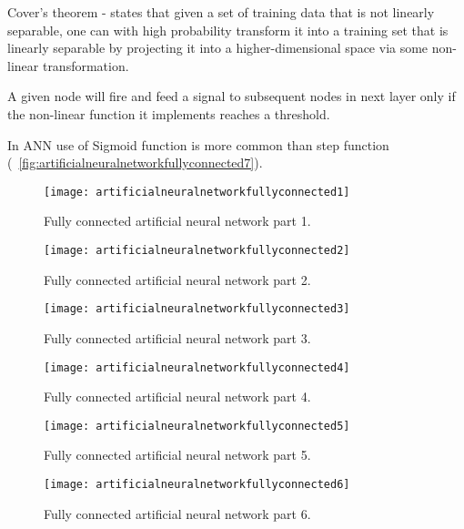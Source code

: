 \begin{numberedlist}
\begin{numberedlist}
			\item Cover's theorem - states that given a set of training data that is not linearly separable, one can with high probability transform it into a training set that is linearly separable by projecting it into a higher-dimensional space via some non-linear transformation.
		\end{numberedlist}
		\item A given node will fire and feed a signal to subsequent nodes in next layer only if the non-linear function it implements reaches a threshold.
		\item In ANN use of Sigmoid function is more common than step function (\figurename~\ref{fig:artificialneuralnetworkfullyconnected7}).
	\end{numberedlist}

 	\begin{figure}[h]
		\centering
		\texttt{[image: artificialneuralnetworkfullyconnected1]}
		\caption[Fully connected artificial neural network part 1]{Fully connected artificial neural network part 1.}
		\label{fig:artificialneuralnetworkfullyconnected1}
	\end{figure}
 	\begin{figure}[h]
		\centering
		\texttt{[image: artificialneuralnetworkfullyconnected2]}
		\caption[Fully connected artificial neural network part 2]{Fully connected artificial neural network part 2.}
		\label{fig:artificialneuralnetworkfullyconnected2}
	\end{figure}
 	\begin{figure}[h]
		\centering
		\texttt{[image: artificialneuralnetworkfullyconnected3]}
		\caption[Fully connected artificial neural network part 3]{Fully connected artificial neural network part 3.}
		\label{fig:artificialneuralnetworkfullyconnected3}
	\end{figure}
 	\begin{figure}[h]
		\centering
		\texttt{[image: artificialneuralnetworkfullyconnected4]}
		\caption[Fully connected artificial neural network part 4]{Fully connected artificial neural network part 4.}
		\label{fig:artificialneuralnetworkfullyconnected4}
	\end{figure}
 	\begin{figure}[h]
		\centering
		\texttt{[image: artificialneuralnetworkfullyconnected5]}
		\caption[Fully connected artificial neural network part 5]{Fully connected artificial neural network part 5.}
		\label{fig:artificialneuralnetworkfullyconnected5}
	\end{figure}
 	\begin{figure}[h]
		\centering
		\texttt{[image: artificialneuralnetworkfullyconnected6]}
		\caption[Fully connected artificial neural network part 6]{Fully connected artificial neural network part 6.}
		\label{fig:artificialneuralnetworkfullyconnected6}
	\end{figure}

